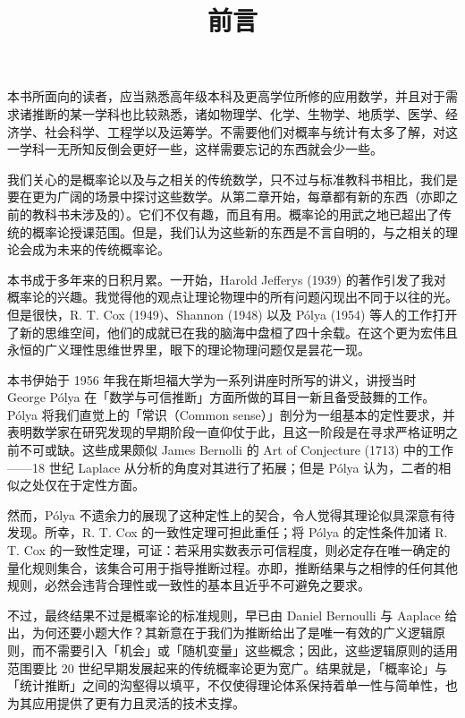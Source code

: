 \title{前言}


本书所面向的读者，应当熟悉高年级本科及更高学位所修的应用数学，并且对于需求诸推断的某一学科也比较熟悉，诸如物理学、化学、生物学、地质学、医学、经济学、社会科学、工程学以及运筹学。不需要他们对概率与统计有太多了解，对这一学科一无所知反倒会更好一些，这样需要忘记的东西就会少一些。

我们关心的是概率论以及与之相关的传统数学，只不过与标准教科书相比，我们是要在更为广阔的场景中探讨这些数学。从第二章开始，每章都有新的东西（亦即之前的教科书未涉及的）。它们不仅有趣，而且有用。概率论的用武之地已超出了传统的概率论授课范围。但是，我们认为这些新的东西是不言自明的，与之相关的理论会成为未来的传统概率论。

\subject{历史}

本书成于多年来的日积月累。一开始，Harold Jefferys (1939) 的著作引发了我对概率论的兴趣。我觉得他的观点让理论物理中的所有问题闪现出不同于以往的光。但是很快，R. T. Cox (1949)、Shannon (1948) 以及 Pólya (1954) 等人的工作打开了新的思维空间，他们的成就已在我的脑海中盘桓了四十余载。在这个更为宏伟且永恒的广义理性思维世界里，眼下的理论物理问题仅是昙花一现。

本书伊始于 1956 年我在斯坦福大学为一系列讲座时所写的讲义，讲授当时 George  Pólya 在「数学与可信推断」方面所做的耳目一新且备受鼓舞的工作。Pólya 将我们直觉上的「常识（Common sense）」剖分为一组基本的定性要求，并表明数学家在研究发现的早期阶段一直仰仗于此，且这一阶段是在寻求严格证明之前不可或缺。这些成果颇似 James Bernolli 的 Art of Conjecture (1713) 中的工作——18 世纪 Laplace 从分析的角度对其进行了拓展；但是 Pólya 认为，二者的相似之处仅在于定性方面。

然而，Pólya 不遗余力的展现了这种定性上的契合，令人觉得其理论似具深意有待发现。所幸，R. T. Cox 的一致性定理可担此重任；将 Pólya 的定性条件加诸 R. T. Cox 的一致性定理，可证：若采用实数表示可信程度，则必定存在唯一确定的量化规则集合，该集合可用于指导推断过程。亦即，推断结果与之相悖的任何其他规则，必然会违背合理性或一致性的基本且近乎不可避免之要求。

不过，最终结果不过是概率论的标准规则，早已由 Daniel Bernoulli 与 Aaplace 给出，为何还要小题大作？其新意在于我们为推断给出了是唯一有效的广义逻辑原则，而不需要引入「机会」或「随机变量」这些概念；因此，这些逻辑原则的适用范围要比 20 世纪早期发展起来的传统概率论更为宽广。结果就是，「概率论」与「统计推断」之间的沟壑得以填平，不仅使得理论体系保持着单一性与简单性，也为其应用提供了更有力且灵活的技术支撑。

